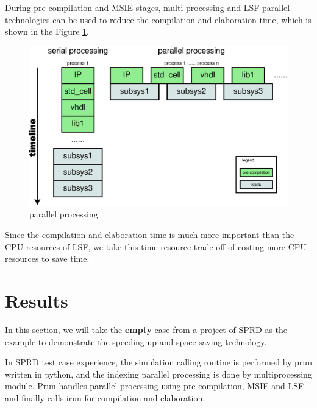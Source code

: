 \documentclass[twoside]{article}
\begin{document}
\begin{multicols}{2}
  During pre-compilation and MSIE stages, multi-processing and LSF parallel technologies can be used to reduce the compilation and elaboration time, which is shown in the Figure \ref{fig:parallel}.
  \begin{figure}[H]
    \centering
    \includegraphics[width=\linewidth]{parallel}
    \caption{parallel processing}
    \label{fig:parallel}
  \end{figure}
  Since the compilation and elaboration time is much more important than the CPU resources of LSF, we take this time-resource trade-off of costing more CPU resources to save time.


  \section{Results}

  In this section, we will take the \textbf{empty} case from a project of SPRD as the example to demonstrate the speeding up and space saving technology.
  
  In SPRD test case experience, the simulation calling routine is performed by prun written in python, and the indexing parallel processing is done by multiprocessing module. Prun handles parallel processing using pre-compilation, MSIE and LSF and finally calls irun for compilation and elaboration.


\end{multicols}
\end{document}
